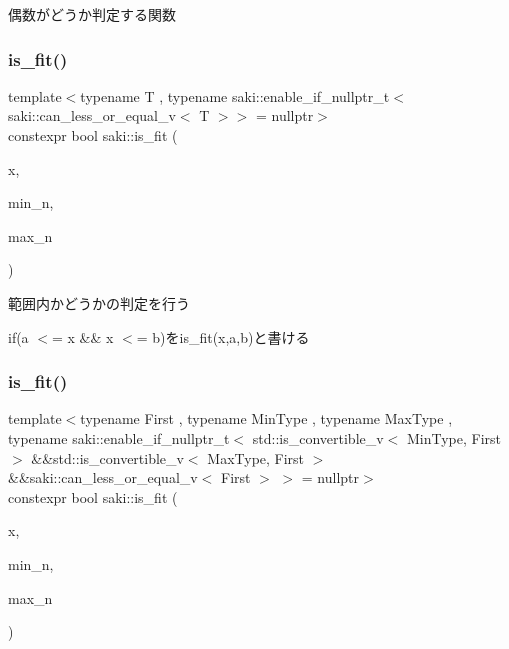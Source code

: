 偶数がどうか判定する関数 

\mbox{\label{namespacesaki_a45597d7382905409bada2316f78502fc}} 
\subsubsection{\texorpdfstring{is\+\_\+fit()}{is\_fit()}\hspace{0.1cm}{\footnotesize\ttfamily [1/2]}}
{\footnotesize\ttfamily template$<$typename T , typename saki\+::enable\+\_\+if\+\_\+nullptr\+\_\+t$<$ saki\+::can\+\_\+less\+\_\+or\+\_\+equal\+\_\+v$<$ T $>$$>$  = nullptr$>$ \\
constexpr bool saki\+::is\+\_\+fit (\begin{DoxyParamCaption}\item[{const T \&}]{x,  }\item[{const T \&}]{min\+\_\+n,  }\item[{const T \&}]{max\+\_\+n }\end{DoxyParamCaption})}



範囲内かどうかの判定を行う 

if(a $<$= x \&\& x $<$= b)をis\+\_\+fit(x,a,b)と書ける \mbox{\label{namespacesaki_a09478d8cb01d75e93d34f884d7133dc9}} 
\subsubsection{\texorpdfstring{is\+\_\+fit()}{is\_fit()}\hspace{0.1cm}{\footnotesize\ttfamily [2/2]}}
{\footnotesize\ttfamily template$<$typename First , typename Min\+Type , typename Max\+Type , typename saki\+::enable\+\_\+if\+\_\+nullptr\+\_\+t$<$ std\+::is\+\_\+convertible\+\_\+v$<$ Min\+Type, First $>$ \&\&std\+::is\+\_\+convertible\+\_\+v$<$ Max\+Type, First $>$ \&\&saki\+::can\+\_\+less\+\_\+or\+\_\+equal\+\_\+v$<$ First $>$ $>$  = nullptr$>$ \\
constexpr bool saki\+::is\+\_\+fit (\begin{DoxyParamCaption}\item[{First}]{x,  }\item[{Min\+Type}]{min\+\_\+n,  }\item[{Max\+Type}]{max\+\_\+n }\end{DoxyParamCaption})}



